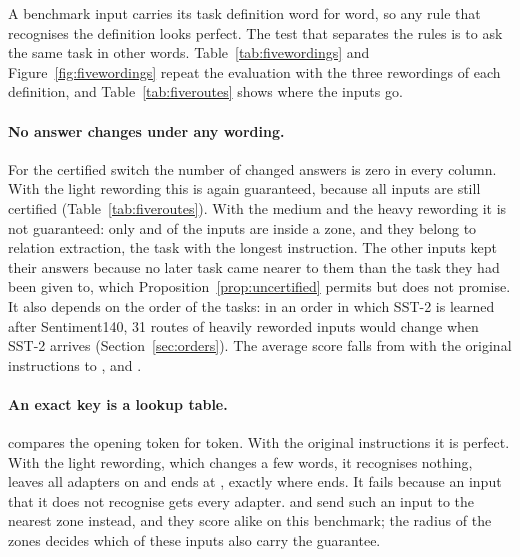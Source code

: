 \begin{table}[t]
  \caption{Routes on the five tasks: how many test inputs are certified, how many are given to
  their own task, and how many answers change, for the certified switch and for the nearest-centre
  rule. Routes do not depend on the seed; counts are summed over seeds.}
  \label{tab:fiveroutes}
  \centering
  \small
  \setlength{\tabcolsep}{4.5pt}
  
\end{table}

\begin{table}[t]
  \caption{Five tasks, original and reworded: AP and changed answers (as Table~\ref{tab:fivemain}).}
  \label{tab:fivewordings}
  \centering
  \footnotesize
  \setlength{\tabcolsep}{3pt}
  
\end{table}


A benchmark input carries its task definition word for word, so any rule that recognises the
definition looks perfect. The test that separates the rules is to ask the same task in other
words. Table~\ref{tab:fivewordings} and Figure~\ref{fig:fivewordings} repeat the evaluation with the
three rewordings of each definition, and Table~\ref{tab:fiveroutes} shows where the inputs go.

\paragraph{No answer changes under any wording.} For the certified switch the number of changed answers is zero in every column.
With the light rewording this is again guaranteed, because all \FiveCertZoneOneLight{} inputs are
still certified (Table~\ref{tab:fiveroutes}). With the medium and the heavy rewording it is not
guaranteed: only \FiveCertZoneOneMedium{} and \FiveCertZoneOneHeavy{} of the \FiveCertInputsOne{}
inputs are inside a zone, and they belong to relation extraction, the task with the longest
instruction. The other inputs kept their answers because no later task came nearer to them than
the task they had been given to, which Proposition~\ref{prop:uncertified} permits but does not
promise. It also depends on the order of the tasks: in an order in which SST-2 is learned after
Sentiment140, 31 routes of heavily reworded inputs would change when SST-2 arrives
(Section~\ref{sec:orders}). The average
score falls from \FiveCertAP{} with the original instructions to \FiveCertAPLight{},
\FiveCertAPMedium{} and \FiveCertAPHeavy{}.

\paragraph{An exact key is a lookup table.} \keyswitch{} compares the opening token for token. With the original instructions
it is perfect. With the light rewording, which changes a few words, it recognises nothing, leaves
all adapters on and ends at \FiveKeyAPLight{}, exactly where \plain{} ends. It fails because an
input that it does not recognise gets every adapter. \nearest{} and \cert{} send such an input to
the nearest zone instead, and they score alike on this benchmark; the radius of the zones decides
which of these inputs also carry the guarantee.

